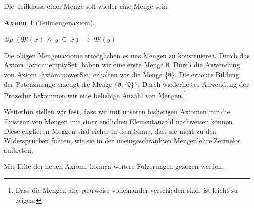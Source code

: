 \documentclass[a4paper,german,10pt,twoside]{book}
\newtheorem{ax}{Axiom}
\theoremstyle{definition}
\theoremstyle{remark}
\begin{document}
\par
Die Teilklasse einer Menge soll wieder eine Menge sein.

\begin{ax}[Teilmengenaxiom]
\label{axiom:subset} \hypertarget{axiom:subset}{}
\mbox{}
\begin{longtable}{{@{\extracolsep{\fill}}p{\linewidth}}}
\centering $(\mathfrak{M}(x)\ \land \ y \ \subseteq \ x)\ \rightarrow \ \mathfrak{M}(y)$
\end{longtable}

\end{ax}




Die obigen Mengenaxiome erm{\"o}glichen es uns Mengen zu konstruieren.
Durch das Axiom~\ref{axiom:emptySet} haben wir eine erste Menge $\emptyset$. 
Durch die Anwendung von Axiom~\ref{axiom:powerSet} erhalten wir die Menge
$\{ \emptyset \}$. Die erneute Bildung der Potenzmenge erzeugt die Menge
$\{ \emptyset, \{ \emptyset \} \}$. Durch wiederholtes Anwendung der Prozedur
bekommen wir eine beliebige Anzahl von Mengen.\footnote{Dass die Mengen alle
paarweise voneinander verschieden sind, ist leicht zu zeigen.}

\par
Weiterhin stellen wir fest, dass wir mit unseren bisherigen Axiomen nur die 
Existenz von Mengen mit einer endlichen Elementanzahl nachweisen k{\"o}nnen.
Diese englichen Mengen sind {\glqq sicher\grqq} in dem Sinne, dass sie nicht zu
den Widerspr{\"u}chen f{\"u}hren, wie sie in der uneingeschr{\"a}nkten Mengenlehre 
Zermelos auftreten,


\par
Mit Hilfe der neuen Axiome k{\"o}nnen weitere Folgerungen gezogen werden.
\end{document}
